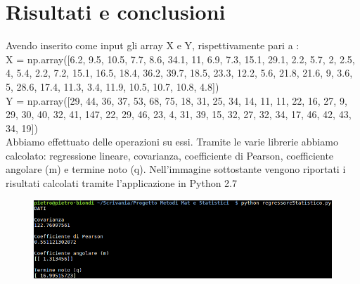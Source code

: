 \documentclass[a4paper,12pt,titlepage,oneside,openany]{book}
\begin{document}
\chapter{Risultati e conclusioni}
Avendo inserito come input gli array X e Y, rispettivamente pari a :\\
X = np.array([6.2, 9.5, 10.5, 7.7, 8.6, 34.1, 11, 6.9, 7.3, 15.1, 29.1, 2.2, 5.7, 2, 2.5, 4, 5.4, 2.2, 7.2, 15.1, 16.5, 18.4, 36.2, 39.7, 18.5, 23.3, 12.2, 5.6, 21.8, 21.6, 9, 3.6, 5, 28.6, 17.4, 11.3, 3.4, 11.9, 10.5, 10.7, 10.8, 4.8])
\\
Y = np.array([29, 44, 36, 37, 53, 68, 75, 18, 31, 25, 34, 14, 11, 11, 22, 16, 27, 9, 29, 30, 40, 32, 41, 147, 22, 29, 46, 23, 4, 31, 39, 15, 32, 27, 32, 34, 17, 46, 42, 43, 34, 19])\\
Abbiamo effettuato delle operazioni su essi.
Tramite le varie librerie abbiamo calcolato: regressione lineare, covarianza, coefficiente di Pearson, coefficiente angolare (m) e termine noto (q).
Nell’immagine sottostante vengono riportati i risultati calcolati tramite l’applicazione in Python 2.7
\begin{figure}[H]
	\centering	\includegraphics[scale=0.6]{risultati.png}
	\label{fig:risultati}
\end{figure}
\newpage
\end{document}
